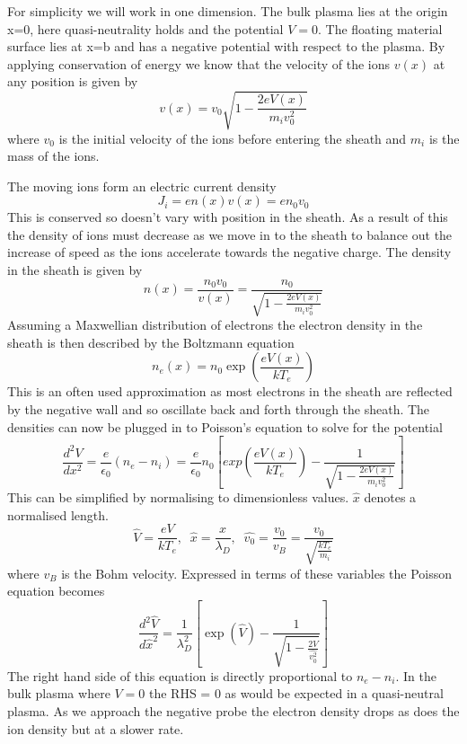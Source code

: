\documentclass[12pt]{article}
\def\be{\begin{equation}}
\def\ee{\end{equation}}
\begin{document}
For simplicity we will work in one dimension. The bulk plasma lies at the origin x=0, here quasi-neutrality holds and the potential $V=0$. The floating material surface lies at x=b and has a negative potential with respect to the plasma. 
By applying conservation of energy we know that the velocity of the ions $v(x)$ at any position is given by 
\be 
v(x) = v_0 \sqrt{1 - \frac{2 e V(x)}{m_i v_0^2}}
\ee
where $v_0$ is the initial velocity of the ions before entering the sheath and $m_i$ is the mass of the ions. 

The moving ions form an electric current density  
\be 
J_i = e n(x) v(x) = e n_0 v_0 
\ee
This is conserved so doesn't vary with position in the sheath. As a result of this the density of ions must decrease as we move in to the sheath to balance out the increase of speed as the ions accelerate towards the negative charge. The density in the sheath is given by 
\be 
n(x) = \frac{n_0 v_0 }{v(x)} = \frac{n_0}{\sqrt{1 - \frac{2 e V(x)}{m_i v_0^2}}}
\ee 
Assuming a Maxwellian distribution of electrons the electron density in the sheath is then described by the Boltzmann equation 
\be
n_e(x) = n_0 \exp \left(\frac{e V(x)}{k T_e}\right)
\label{eq:sheathdense}
\ee
This is an often used approximation as most electrons in the sheath are reflected by the negative wall and so oscillate back and forth through the sheath.
The densities can now be plugged in to Poisson's equation to solve for the potential 
\be
\frac{d^2 V}{dx^2} = \frac{e}{\epsilon_0} (n_e - n_i) =  \frac{e}{\epsilon_0} n_0 \left[exp \left(\frac{e V(x)}{k T_e}\right) - \frac{1}{\sqrt{1 - \frac{2 e V(x)}{m_i v_0^2}}} \right]
\label{eq:poisson}
\ee 
This can be simplified by normalising to dimensionless values. $\hat{x}$ denotes a normalised length.
\be 
\hat{V} = \frac{e V }{k T_e}, \;\; \hat{x} = \frac{x}{\lambda_D}, \;\; \hat{v_0} = \frac{v_0}{v_B} = \frac{v_0}{\sqrt{\frac{k T_e}{m_i}}}
\ee
where $v_B$ is the Bohm velocity. Expressed in terms of these variables the Poisson equation becomes
\be 
\frac{d^2 \hat{V}}{d \hat{x}^2} = \frac{1}{\lambda_D ^2} \left[\exp(\hat{V}) - \frac{1}{\sqrt{1 - \frac{2\hat{V}}{\hat{v_0^2}}}}\right]
\label{eq:normalisedpoisson}
\ee 
The right hand side of this equation is directly proportional to $n_e - n_i$. In the bulk plasma where $V=0$ the RHS = 0 as would be expected in a quasi-neutral plasma. As we approach the negative probe the electron density drops as does the ion density but at a slower rate.
\end{document}
